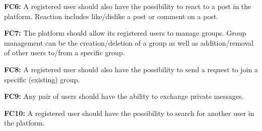 \documentclass[12pt,a4paper]{article}
\begin{document}
\textbf{FC6:} A registered user should also have the possibility to react to a post in the platform. Reaction includes like/dislike a post or comment on a post.

\textbf{FC7:} The platform should allow its registered users to manage groups. Group management can be the creation/deletion of a group as well as addition/removal of other users to/from a specific group.

\textbf{FC8:} A registered user should also have the possibility to send a request to join a specific (existing) group.

\textbf{FC9:} Any pair of users should have the ability to exchange private messages.

\textbf{FC10:}  A registered user should have the possibility to search for another user in the platform.
\end{document}

